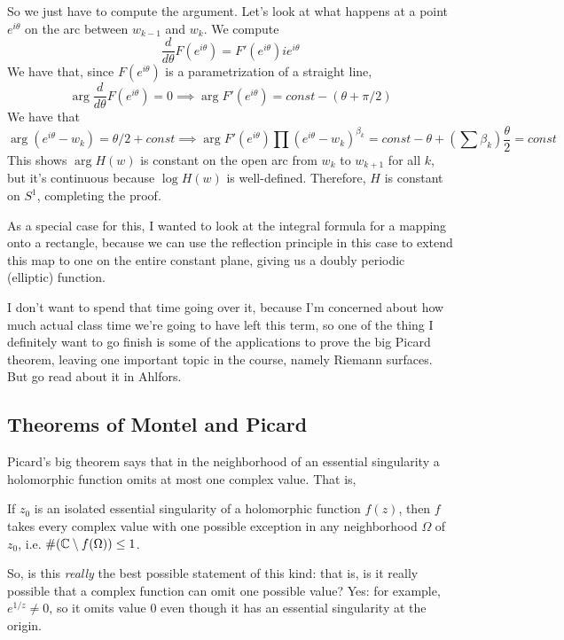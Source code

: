 \documentclass{article}
\begin{document}
So we just have to compute the argument. Let's look at what happens at a point \(e^{i\theta}\) on the arc between \(w_{k - 1}\) and \(w_k\). We compute
\begin{equation}\frac{d}{d\theta}F(e^{i\theta}) = F'(e^{i\theta})ie^{i\theta}\end{equation}
We have that, since \(F(e^{i\theta})\) is a parametrization of a straight line,
\begin{equation}\arg\frac{d}{d\theta}F(e^{i\theta}) = 0 \implies \arg F'(e^{i\theta}) = const - (\theta + \pi/2)\end{equation}
We have that
\begin{equation}\arg(e^{i\theta} - w_k) = \theta/2 + const \implies \arg F'(e^{i\theta})\prod(e^{i\theta} - w_k)^{\beta_k} = const - \theta + (\sum\beta_k)\frac{\theta}{2} = const\end{equation}
This shows \(\arg H(w)\) is constant on the open arc from \(w_k\) to \(w_{k + 1}\) for all \(k\), but it's continuous because \(\log H(w)\) is well-defined. Therefore, \(H\) is constant on \(S^1\), completing the proof.

As a special case for this, I wanted to look at the integral formula for a mapping onto a rectangle, because we can use the reflection principle in this case to extend this map to one on the entire constant plane, giving us a doubly periodic (elliptic) function.

I don't want to spend that time going over it, because I'm concerned about how much actual class time we're going to have left this term, so one of the thing I definitely want to go finish is some of the applications to prove the big Picard theorem, leaving one important topic in the course, namely Riemann surfaces. But go read about it in Ahlfors.


\subsection{Theorems of Montel and Picard}

Picard's big theorem says that in the neighborhood of an essential singularity a holomorphic function omits at most one complex value. That is,
\begin{theorem}
If \(z_0\) is an isolated essential singularity of a holomorphic function \(f(z)\), then \(f\) takes every complex value with one possible exception in any neighborhood \(\Omega\) of \(z_0\), i.e. \(\#(\mathbb{C}\setminus f(\Omega)) \leq 1\).
\end{theorem}
So, is this \textit{really} the best possible statement of this kind: that is, is it really possible that a complex function can omit one possible value? Yes: for example, \(e^{1/z} \neq 0\), so it omits value \(0\) even though it has an essential singularity at the origin.
\end{document}
